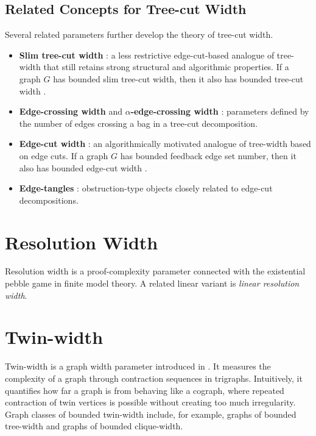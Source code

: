 \documentclass[10pt]{book}
\theoremstyle{definition}
\begin{document}
\subsection{Related Concepts for Tree-cut Width}

Several related parameters further develop the theory of tree-cut width.

\begin{itemize}
    \item \textbf{Slim tree-cut width} \cite{17}: a less restrictive edge-cut-based analogue of tree-width that still retains strong structural and algorithmic properties.  
    If a graph \(G\) has bounded slim tree-cut width, then it also has bounded tree-cut width \cite{17}.

    \item \textbf{Edge-crossing width} and \textbf{\(\alpha\)-edge-crossing width} \cite{19,251}: parameters defined by the number of edges crossing a bag in a tree-cut decomposition.

    \item \textbf{Edge-cut width} \cite{20}: an algorithmically motivated analogue of tree-width based on edge cuts.  
    If a graph \(G\) has bounded feedback edge set number, then it also has bounded edge-cut width \cite{19}.

    \item \textbf{Edge-tangles} \cite{8}: obstruction-type objects closely related to edge-cut decompositions.
\end{itemize}

\section{Resolution Width}

Resolution width \cite{21} is a proof-complexity parameter connected with the existential pebble game in finite model theory.  
A related linear variant is \emph{linear resolution width}.

\section{Twin-width}

Twin-width is a graph width parameter introduced in \cite{22,23,24}.  
It measures the complexity of a graph through contraction sequences in trigraphs.  
Intuitively, it quantifies how far a graph is from behaving like a cograph, where repeated contraction of twin vertices is possible without creating too much irregularity.  
Graph classes of bounded twin-width include, for example, graphs of bounded tree-width and graphs of bounded clique-width.
\end{document}
